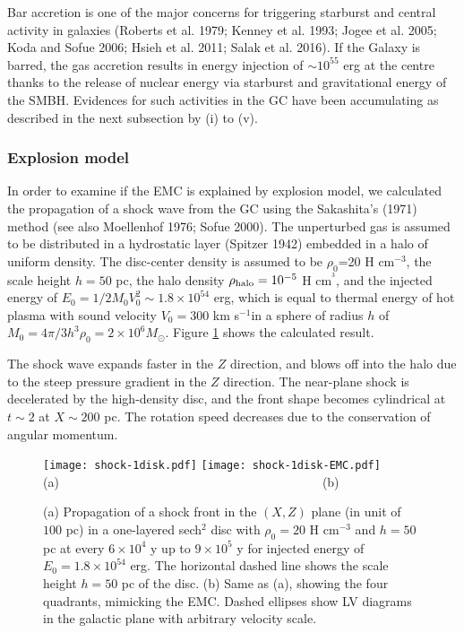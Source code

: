 \documentclass[useAMS,usenatbib]{mn2e}
\def\kms{km s$^{-1}$}
\def\Msun{M_\odot}
\begin{document}
 
Bar accretion is one of the major concerns for triggering starburst and central activity in galaxies (Roberts et al. 1979; Kenney et al. 1993; Jogee et al. 2005; Koda and Sofue 2006; Hsieh et al. 2011; Salak et al. 2016). If the Galaxy is barred, the gas accretion results in energy injection of $\sim 10^{55}$ erg at the centre thanks to the release of nuclear energy via starburst and gravitational energy of the SMBH. Evidences for such activities in the GC have been accumulating as described in the next subsection by (i) to (v). 
 

\subsubsection{Explosion model}  

In order to examine if the EMC is explained by explosion model, we calculated the propagation of a shock wave from the GC using the Sakashita's (1971) method (see also Moellenhof 1976; Sofue 2000). The unperturbed gas is assumed to be distributed in a hydrostatic layer (Spitzer 1942) embedded in a halo of uniform density. The disc-center density is assumed to be $\rho_0$=20 H cm$^{-3}$, the scale height $h=50$ pc, the halo density $\rho_{\rm halo}=10^{-5}$ H cm$^{^3}$, and the injected energy of $E_0=1/2 M_0 V_0^2 \sim 1.8\times 10^{54}$ erg, which is equal to thermal energy of hot plasma with sound velocity $V_0 = 300$ \kms in a sphere of radius $h$ of $M_0=4 \pi/3 h^3 \rho_0 = 2\times 10^6\Msun$. Figure \ref{shock} shows the calculated result. 

The shock wave expands faster in the $Z$ direction, and blows off into the halo due to the steep pressure gradient in the $Z$ direction. The near-plane shock is decelerated by the high-density disc, and the front shape becomes cylindrical at $t\sim 2$ at $X\sim 200$ pc. The rotation speed decreases due to the conservation of angular momentum.  

\begin{figure} 
\begin{center}   
\texttt{[image: shock-1disk.pdf]}
\texttt{[image: shock-1disk-EMC.pdf]}\\  
(a)~~~~~~~~~~~~~~~~~~~~~~~~~~~~~~~~~~~~~~~~~~(b)\\ 
\end{center}
\caption{
(a) Propagation of a shock front in the $(X, Z)$ plane (in unit of $100$ pc) in a one-layered sech$^2$ disc with $\rho_0=20$ H cm$^{-3}$ and $h=50$ pc at every $6\times 10^4$ y up to $9\times 10^5$ y for injected energy of $E_0=1.8\times 10^{54}$ erg. The horizontal dashed line shows the scale height $h=50$ pc of the disc. 
(b) Same as (a), showing the four quadrants, mimicking the EMC. Dashed ellipses show LV diagrams in the galactic plane with arbitrary velocity scale. 
}
 \label{shock}  
\end{figure}  
  
\end{document}
